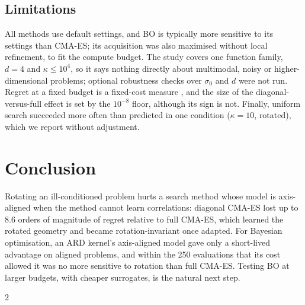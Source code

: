 \documentclass[12pt]{article}
\begin{document}
\subsection{Limitations}
All methods use default settings, and BO is typically more sensitive to its settings than CMA-ES; its acquisition was also maximised without local refinement, to fit the compute budget. The study covers one function family, $d=4$ and $\kappa\le 10^4$, so it says nothing directly about multimodal, noisy or higher-dimensional problems; optional robustness checks over $\sigma_0$ and $d$ were not run. Regret at a fixed budget is a fixed-cost measure \parencite{hansen2009setup}, and the size of the diagonal-versus-full effect is set by the $10^{-8}$ floor, although its sign is not. Finally, uniform search succeeded more often than predicted in one condition ($\kappa=10$, rotated), which we report without adjustment.

\section{Conclusion}
\label{sec:conclusion}
Rotating an ill-conditioned problem hurts a search method whose model is axis-aligned when the method cannot learn correlations: diagonal CMA-ES lost up to 8.6 orders of magnitude of regret relative to full CMA-ES, which learned the rotated geometry and became rotation-invariant once adapted. For Bayesian optimisation, an ARD kernel's axis-aligned model gave only a short-lived advantage on aligned problems, and within the 250 evaluations that its cost allowed it was no more sensitive to rotation than full CMA-ES. Testing BO at larger budgets, with cheaper surrogates, is the natural next step.

\begin{multicols}{2}
\footnotesize            %
\printbibliography
\end{multicols}
\end{document}
